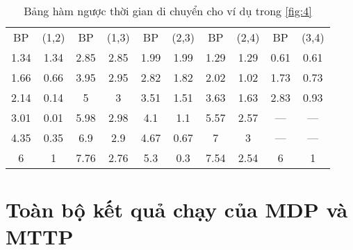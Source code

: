 \documentclass[../main.tex]{subfiles}
\begin{document}
\begin{table}[H]
    \centering
    \caption{Bảng hàm ngược thời gian di chuyển cho ví dụ trong \autoref{fig:4}}
    \label{tabel:rev-arc}
    \small
    \setlength\extrarowheight{-1pt}
    \begin{tabular}{|c|c||c|c||c|c||c|c||c|c|}
    \toprule
    BP   & (1,2) & BP   & (1,3) & BP   & (2,3) & BP   & (2,4) & BP   & (3,4) \\ 
    1.34 & 1.34  & 2.85 & 2.85  & 1.99 & 1.99  & 1.29 & 1.29  & 0.61 & 0.61  \\ 
    1.66 & 0.66  & 3.95 & 2.95  & 2.82 & 1.82  & 2.02 & 1.02  & 1.73 & 0.73  \\ 
    2.14 & 0.14  & 5    & 3     & 3.51 & 1.51  & 3.63 & 1.63  & 2.83 & 0.93  \\ 
    3.01 & 0.01  & 5.98 & 2.98  & 4.1  & 1.1   & 5.57 & 2.57  & --- & ---  \\ 
    4.35 & 0.35  & 6.9  & 2.9   & 4.67 & 0.67  & 7    & 3     & --- & ---  \\ 
    6    & 1     & 7.76 & 2.76  & 5.3  & 0.3   & 7.54 & 2.54  & 6    & 1     \\ 
    \bottomrule
    \end{tabular}
\end{table}

\section{Toàn bộ kết quả chạy của MDP và MTTP}\label{appendix-mdp-mttp}
\end{document}
